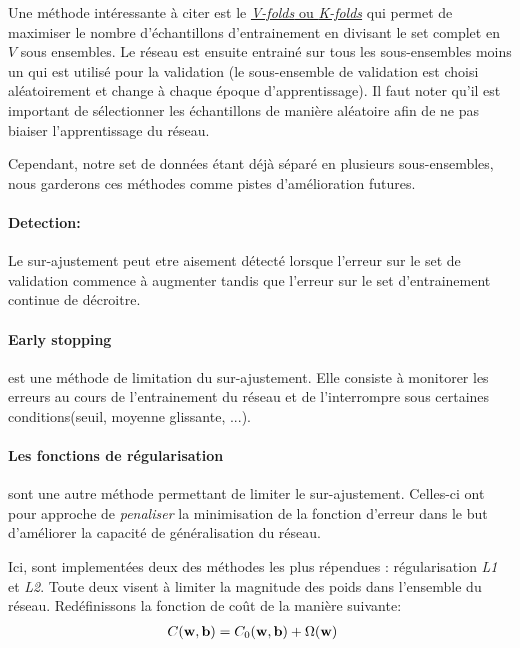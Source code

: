 \documentclass[11pt]{article}
\begin{document}
Une m\'ethode int\'eressante \`a citer est le \href{http://work.caltech.edu/slides/slides13.pdf}
{\emph{V-folds} ou \emph{K-folds}} qui permet de maximiser le nombre d'\'echantillons
d'entrainement en divisant le set complet en $V$ sous ensembles. Le r\'eseau est
ensuite entrain\'e sur tous les sous-ensembles moins un qui est utilis\'e pour la
validation (le sous-ensemble de validation est choisi al\'eatoirement et change
\`a chaque \'epoque d'apprentissage). Il faut noter qu'il est important de
s\'electionner les \'echantillons de mani\`ere al\'eatoire afin de ne pas biaiser
l'apprentissage du r\'eseau.

Cependant, notre set de donn\'ees \'etant d\'ej\`a s\'epar\'e en plusieurs sous-ensembles,
nous garderons ces m\'ethodes comme pistes d'am\'elioration futures.

\paragraph{Detection: }Le sur-ajustement peut etre aisement d\'etect\'e lorsque
l'erreur sur le set de validation commence \`a augmenter tandis que l'erreur sur
le set d'entrainement continue de d\'ecroitre.

\paragraph{Early stopping} est une m\'ethode de limitation du sur-ajustement. Elle
consiste \`a monitorer les erreurs au cours de l'entrainement du r\'eseau et
de l'interrompre sous certaines conditions(seuil, moyenne glissante, ...).

\paragraph{Les fonctions de r\'egularisation} sont une autre m\'ethode permettant
de limiter le sur-ajustement. Celles-ci ont pour approche de {\em penaliser}
la minimisation de la fonction d'erreur dans le but d'am\'eliorer la capacit\'e de
g\'en\'eralisation du r\'eseau.

Ici, sont implement\'ees deux des m\'ethodes les plus r\'ependues :
r\'egularisation \emph{L1} et \emph{L2}. Toute deux visent \`a limiter
la magnitude des poids dans l'ensemble du r\'eseau.
Red\'efinissons la fonction de co\^ut de la mani\`ere suivante:
\begin{equation}
	\begin{aligned}
		C({\bf w}, {\bf b}) &= C_0({\bf w}, {\bf b}) + \Omega({\bf w})
	\end{aligned}
\end{equation}
\end{document}
